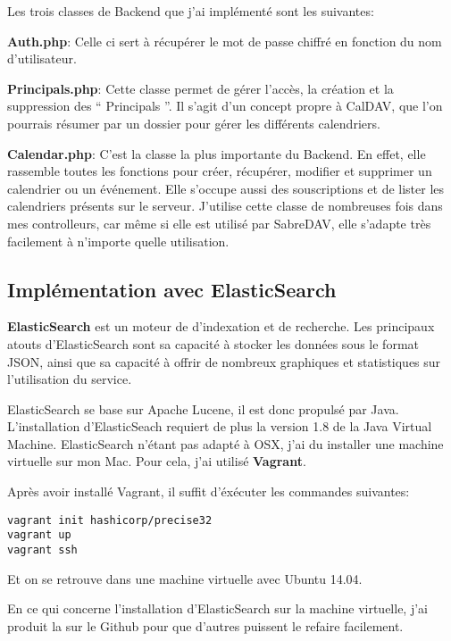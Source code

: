 Les trois classes de Backend que j'ai implémenté sont les suivantes:

\textbf{Auth.php}: Celle ci sert à récupérer le mot de passe chiffré en fonction du nom d'utilisateur.

\textbf{Principals.php}: Cette classe permet de gérer l'accès, la création et la suppression des `` Principals ''. Il s'agit d'un concept propre à CalDAV, que l'on pourrais résumer par un dossier pour gérer les différents calendriers.

\textbf{Calendar.php}: C'est la classe la plus importante du Backend. En effet, elle rassemble toutes les fonctions pour créer, récupérer, modifier et supprimer un calendrier ou un événement. Elle s'occupe aussi des souscriptions et de lister les calendriers présents sur le serveur. J'utilise cette classe de nombreuses fois dans mes controlleurs, car même si elle est utilisé par SabreDAV, elle s'adapte très facilement à n'importe quelle utilisation.

\subsection{Implémentation avec ElasticSearch}

\textbf{ElasticSearch} est un moteur de d'indexation et de recherche. Les principaux atouts d'ElasticSearch sont sa capacité à stocker les données sous le format JSON, ainsi que sa capacité à offrir de nombreux graphiques et statistiques sur l'utilisation du service.

ElasticSearch se base sur Apache Lucene, il est donc propulsé par Java. L'installation d'ElasticSeach requiert de plus la version 1.8 de la Java Virtual Machine. ElasticSearch n'étant pas adapté à OSX, j'ai du installer une machine virtuelle sur mon Mac. Pour cela, j'ai utilisé \textbf{Vagrant}.

Après avoir installé Vagrant, il suffit d'éxécuter les commandes suivantes:

\begin{lstlisting}
vagrant init hashicorp/precise32
vagrant up
vagrant ssh
\end{lstlisting}

Et on se retrouve dans une machine virtuelle avec Ubuntu 14.04.

En ce qui concerne l'installation d'ElasticSearch sur la machine virtuelle, j'ai produit la  sur le Github pour que d'autres puissent le refaire facilement.

